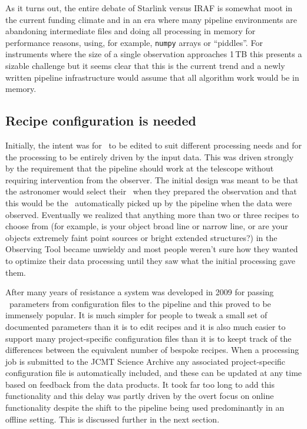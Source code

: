 \documentclass[final,authoryear,5p,times,twocolumn]{elsarticle}
\begin{document}
As it turns out, the entire debate of Starlink versus IRAF is somewhat
moot in the current funding climate and in an era where many pipeline
environments \citep[e.g.,][]{2010SPIE.7740E..15A} are abandoning
intermediate files and doing all processing in memory for performance
reasons, using, for example, \texttt{numpy} arrays or ``piddles''. For
instruments where the size of a single observation approaches 1\,TB
\citep[e.g., SWCam at CCAT;][]{2014SPIE9153-21} this presents a
sizable challenge but it seems clear that this is the current trend
and a newly written pipeline infrastructure would assume that all
algorithm work would be in memory.

\subsection{Recipe configuration is needed}

Initially, the intent was for \recipes\ to be edited to suit different
processing needs and for the processing to be entirely driven by the
input data. This was driven strongly by the requirement that the
pipeline should work at the telescope without requiring intervention
from the observer. The initial design was meant to be that the
astronomer would select their \recipe\ when they prepared the
observation and that this would be the \recipe\ automatically picked
up by the pipeline when the data were observed. Eventually we realized
that anything more than two or three recipes to choose from (for
example, is your object broad line or narrow line, or are your objects
extremely faint point sources or bright extended structures?) in the
Observing Tool became unwieldy and most people weren't sure how they
wanted to optimize their data processing until they saw what the
initial processing gave them.

After many years of resistance a system was developed in 2009 for
passing \recipe\ parameters from configuration files to the pipeline
and this proved to be immensely popular. It is much simpler for people
to tweak a small set of documented parameters than it is to edit
recipes and it is also much easier to support many project-specific
configuration files than it is to keept track of the differences
between the equivalent number of bespoke recipes. When a processing
job is submitted to the JCMT Science Archive any associated
project-specific configuration file is automatically included, and
these can be updated at any time based on feedback from the data
products. It took far too long to add this functionality and this
delay was partly driven by the overt focus on online functionality
despite the shift to the pipeline being used predominantly in an
offline setting. This is discussed further in the next section.
\end{document}
